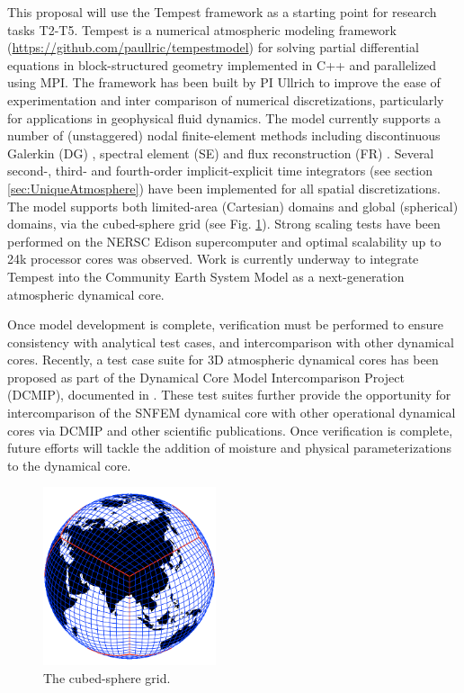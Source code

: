 \documentclass[11pt]{article}
\begin{document}
This proposal will use the Tempest framework as a starting point for research tasks T2-T5.  Tempest is a numerical atmospheric modeling framework (\url{https://github.com/paullric/tempestmodel}) \citep{ullrich2014global} for solving partial differential equations in block-structured geometry implemented in C++ and parallelized using MPI.  The framework has been built by PI Ullrich to improve the ease of experimentation and inter comparison of numerical discretizations, particularly for applications in geophysical fluid dynamics.  The model currently supports a number of (unstaggered) nodal finite-element methods including discontinuous Galerkin (DG) \citep{cockburn2000development}, spectral element (SE) \citep{maday1989spectral} and flux reconstruction (FR) \citep{huynh2007flux}.  Several second-, third- and fourth-order implicit-explicit time integrators (see section \ref{sec:UniqueAtmosphere}) have been implemented for all spatial discretizations.  The model supports both limited-area (Cartesian) domains and global (spherical) domains, via the cubed-sphere grid (see Fig. \ref{fig:CubedSphere}).  Strong scaling tests have been performed on the NERSC Edison supercomputer and optimal scalability up to 24k processor cores was observed.  Work is currently underway to integrate Tempest into the Community Earth System Model \citep{JWHetal2013BAMS} as a next-generation atmospheric dynamical core.

Once model development is complete, verification must be performed to ensure consistency with analytical test cases, and intercomparison with other dynamical cores.  Recently, a test case suite for 3D atmospheric dynamical cores has been proposed as part of the Dynamical Core Model Intercomparison Project (DCMIP), documented in \cite{DCMIP2012TESTCASES, JKPAUCJ2012QJRMS}.  These test suites further provide the opportunity for intercomparison of the SNFEM dynamical core with other operational dynamical cores via DCMIP and other scientific publications.  Once verification is complete, future efforts will tackle the addition of moisture and physical parameterizations to the dynamical core.

\begin{figure}
\begin{center}
\includegraphics[width=2in]{A_CubedSphere}
\end{center}
\caption{The cubed-sphere grid.} \label{fig:CubedSphere}
\end{figure}
\end{document}
